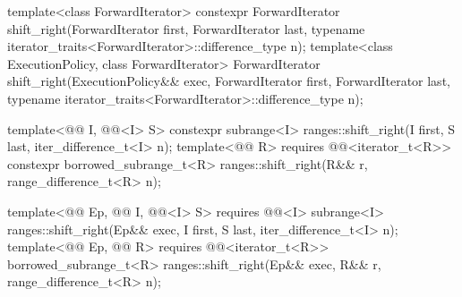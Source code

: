 %
\begin{itemdecl}
template<class ForwardIterator>
  constexpr ForwardIterator
    shift_right(ForwardIterator first, ForwardIterator last,
                typename iterator_traits<ForwardIterator>::difference_type n);
template<class ExecutionPolicy, class ForwardIterator>
  ForwardIterator
    shift_right(ExecutionPolicy&& exec, ForwardIterator first, ForwardIterator last,
                typename iterator_traits<ForwardIterator>::difference_type n);

template<@@ I, @@<I> S>
  constexpr subrange<I> ranges::shift_right(I first, S last, iter_difference_t<I> n);
template<@@ R>
  requires @@<iterator_t<R>>
  constexpr borrowed_subrange_t<R> ranges::shift_right(R&& r, range_difference_t<R> n);

template<@@ Ep, @@ I, @@<I> S>
  requires @@<I>
  subrange<I>
    ranges::shift_right(Ep&& exec, I first, S last, iter_difference_t<I> n);
template<@@ Ep, @@ R>
  requires @@<iterator_t<R>>
  borrowed_subrange_t<R>
    ranges::shift_right(Ep&& exec, R&& r, range_difference_t<R> n);
\end{itemdecl}

